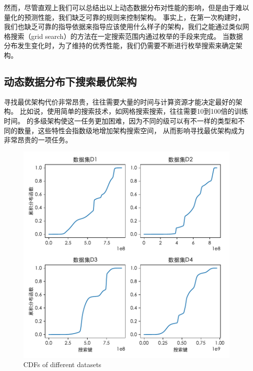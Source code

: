 然而，尽管直观上我们可以总结出以上动态数据分布对{\li}性能的影响，但是由于{\model}难以量化的预测性能，我们缺乏可靠的规则来控制{\rmi}架构。
事实上，在第一次构建{\li}时，我们也缺乏可靠的指导依据来指导应该使用什么样子的{\rmi}架构，我们之能通过类似网格搜索\cite{lavalle2004relationship, lerman1980fitting}（grid search）的方法在一定搜索范围内通过枚举的手段来完成。
当数据分布发生变化时，为了维持{\li}的优秀性能，我们仍需要不断进行枚举搜索来确定{\rmi}架构。

\subsection{动态数据分布下搜索最优{\li}架构}
\label{sec:search-best}

寻找最优{\li}架构代价非常昂贵，往往需要大量的时间与计算资源才能决定最好的{\li}架构。
比如说，使用简单的搜索技术，如网格搜索搜索，往往需要10到100倍的训练时间。
{\li}的多级架构使这一任务更加困难，因为不同的级可以有不一样的{\model}类型和不同的{\model}数量，这些特性会指数级地增加架构搜索空间，
从而影响寻找最优{\li}架构成为非常昂贵的一项任务。

% 

\begin{figure}[!ht]
  \centering
  \includegraphics{figure/four-cdfs.pdf}
    {CDFs of different datasets}
  \label{fig:dist}
\end{figure}

